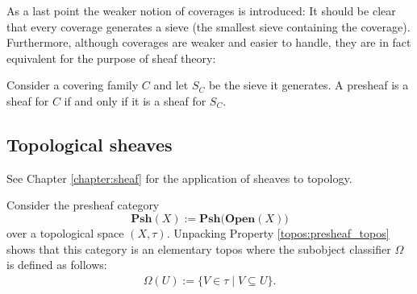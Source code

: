     As a last point the weaker notion of coverages is introduced:
    It should be clear that every coverage generates a sieve (the smallest sieve containing the coverage). Furthermore, although coverages are weaker and easier to handle, they are in fact equivalent for the purpose of sheaf theory:
    \begin{property}
        Consider a covering family $C$ and let $S_C$ be the sieve it generates. A presheaf is a sheaf for $C$ if and only if it is a sheaf for $S_C$.
    \end{property}

\subsection{Topological sheaves}

    See Chapter \ref{chapter:sheaf} for the application of sheaves to topology.

    \begin{property}\label{topos:sheaf_topos}
        Consider the presheaf category \[\mathbf{Psh}(X):=\mathbf{Psh(Open}(X))\] over a topological space $(X,\tau)$. Unpacking Property \ref{topos:presheaf_topos} shows that this category is an elementary topos where the subobject classifier $\Omega$ is defined as follows:
        \begin{gather}
            \Omega(U) := \{V\in\tau\mid V\subseteq U\}.
        \end{gather}
    \end{property}

